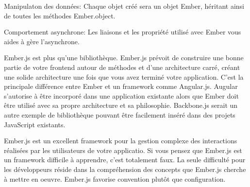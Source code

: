     Manipulaton des données: Chaque objet créé sera un objet Ember, héritant ainsi de toutes les méthodes Ember.object.

    Comportement asynchrone: Les liaisons et les propriété utilisé avec Ember vous aides à gère l’asynchrone.


Ember.js est plus qu’une bibliothèque. Ember.js prévoit de construire une bonne partie de votre frontend autour de méthodes et d’une architecture carré, créant une solide architecture une fois que vous avez terminé votre application. C’est la principale différence entre Ember et un framework comme Angular.js. Augular s’autorise à être incorporé dans une application existante alors que Ember doit être utilisé avec sa propre architecture et sa philosophie. Backbone.js serait un autre exemple de bibliothèque pouvant être facilement inséré dans des projets JavaScript existants.

Ember.js est un excellent framework pour la gestion complexe des interactions réalisées par les utilisateurs de votre applicatio. Si vous pensez que Ember.js est un framework difficile à apprendre, c’est totalement faux. La seule difficulté pour les développeurs réside dans la compréhension des concepts que Ember.js cherche à mettre en oeuvre. Ember.js favorise convention plutôt que configuration.
